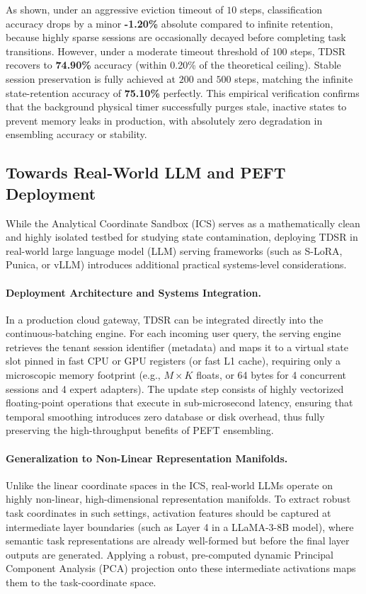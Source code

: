 As shown, under an aggressive eviction timeout of $10$ steps, classification accuracy drops by a minor \textbf{-1.20\%} absolute compared to infinite retention, because highly sparse sessions are occasionally decayed before completing task transitions. However, under a moderate timeout threshold of $100$ steps, TDSR recovers to \textbf{74.90\%} accuracy (within 0.20\% of the theoretical ceiling). Stable session preservation is fully achieved at $200$ and $500$ steps, matching the infinite state-retention accuracy of \textbf{75.10\%} perfectly. This empirical verification confirms that the background physical timer successfully purges stale, inactive states to prevent memory leaks in production, with absolutely zero degradation in ensembling accuracy or stability.

\subsection{Towards Real-World LLM and PEFT Deployment}
While the Analytical Coordinate Sandbox (ICS) serves as a mathematically clean and highly isolated testbed for studying state contamination, deploying TDSR in real-world large language model (LLM) serving frameworks (such as S-LoRA, Punica, or vLLM) introduces additional practical systems-level considerations. 

\paragraph{Deployment Architecture and Systems Integration.}
In a production cloud gateway, TDSR can be integrated directly into the continuous-batching engine. For each incoming user query, the serving engine retrieves the tenant session identifier (metadata) and maps it to a virtual state slot pinned in fast CPU or GPU registers (or fast L1 cache), requiring only a microscopic memory footprint (e.g., $M \times K$ floats, or 64 bytes for 4 concurrent sessions and 4 expert adapters). The update step consists of highly vectorized floating-point operations that execute in sub-microsecond latency, ensuring that temporal smoothing introduces zero database or disk overhead, thus fully preserving the high-throughput benefits of PEFT ensembling.

\paragraph{Generalization to Non-Linear Representation Manifolds.}
Unlike the linear coordinate spaces in the ICS, real-world LLMs operate on highly non-linear, high-dimensional representation manifolds. To extract robust task coordinates in such settings, activation features should be captured at intermediate layer boundaries (such as Layer 4 in a LLaMA-3-8B model), where semantic task representations are already well-formed but before the final layer outputs are generated. Applying a robust, pre-computed dynamic Principal Component Analysis (PCA) projection onto these intermediate activations maps them to the task-coordinate space.

